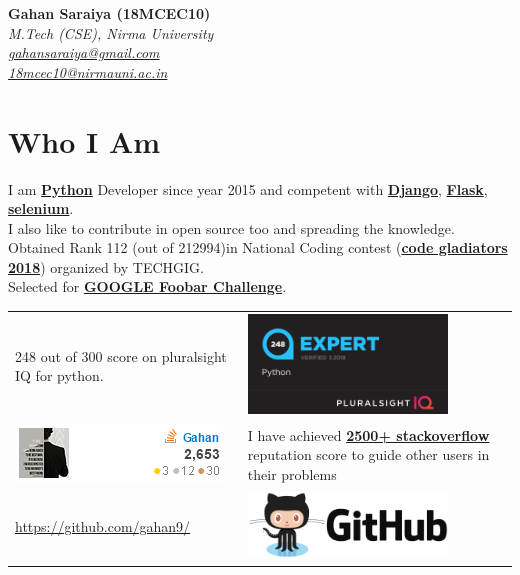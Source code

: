 \documentclass[a4paper, 14pt]{article}
\begin{document}
	\begin{flushright}
		{\large \hfill \textbf{Gahan Saraiya (18MCEC10)}} \\
		\textit{
			M.Tech (CSE), Nirma University \\
			\url{gahansaraiya@gmail.com} \\
			\url{18mcec10@nirmauni.ac.in}
		}
	\end{flushright}	
	\section*{Who I Am}
	I am \href{https://www.python.org/}{\textbf{Python}} Developer since year 2015 and competent with \href{https://www.djangoproject.com/}{\textbf{Django}}, \href{http://flask.pocoo.org/}{\textbf{Flask}}, \href{https://selenium-python.readthedocs.io/}{\textbf{selenium}}.
	\\ I also like to contribute in open source too and spreading the knowledge.
	\\ Obtained Rank 112 (out of 212994)in	National Coding contest (\href{https://www.techgig.com/codegladiators}{\textbf{code gladiators 2018}}) organized by TECHGIG.
	\\ Selected for \href{https://medium.com/magentacodes/things-you-should-know-about-google-foobar-invitation-703a535bf30f}{\textbf{GOOGLE Foobar Challenge}}.
	\begin{table}[H]
		\centering
		\begin{tabular}{ L L }
			248 out of 300 score on pluralsight IQ for python. 
			& 
			{\includegraphics[width=200px]{assets/pyIQ248.png}}
			\\ 
			\href{https://stackoverflow.com/users/flair/7664524.png}{\includegraphics{assets/so7664524.png}}
			& 
			I have achieved \href{https://stackoverflow.com/users/story/7664524}{\textbf{2500+ stackoverflow}}	reputation score to guide other users in their problems
			\\ 
			\url{https://github.com/gahan9/}
			& 
			\href{https://github.com/gahan9/}{\includegraphics[width=200px]{assets/github-logo.png}}
		\end{tabular}
	\end{table}
	
\end{document}
